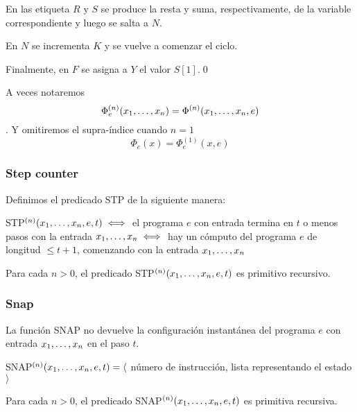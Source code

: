 \begin{demo}
En las etiqueta $R$ y $S$ se produce la resta y suma, respectivamente, de la variable correspondiente y luego se salta a $N$.

En $N$ se incrementa $K$ y se vuelve a comenzar el ciclo.

Finalmente, en $F$ se asigna a $Y$ el valor $S[1]$.\qed
\end{demo}

A veces notaremos $$\Phi^{(n)}_e(x_1,\dots, x_{n}) = \Phi^{(n)}(x_1,\dots, x_{n},e)$$. Y omitiremos el supra-índice cuando $n=1$
$$\Phi_e(x) = \Phi_e^{(1)}(x,e)$$


\subsubsection{Step counter}

Definimos el predicado STP de la siguiente manera:

STP$^{(n)}(x_1,\dots, x_{n}, e,t) \iff$ el programa $e$ con entrada termina en $t$ o menos pasos con la entrada $x_1,\dots, x_{n} \iff$ hay un cómputo del programa $e$ de longitud $\leq t+1$, comenzando con la entrada $x_1,\dots, x_{n}$

\begin{teorema}
	Para cada $n > 0$, el predicado STP$^{(n)}(x_1,\dots, x_{n}, e, t)$ es primitivo recursivo.
\end{teorema}

\subsubsection{Snap}
La función SNAP no devuelve la configuración instantánea del programa $e$ con entrada $x_1,\dots, x_{n}$ en el paso $t$.

SNAP$^{(n)}(x_1,\dots, x_{n}, e,t) = \langle$ número de instrucción, lista representando el estado $\rangle$ 

\begin{teorema}
	Para cada $n > 0$, el predicado SNAP$^{(n)}(x_1,\dots, x_{n}, e, t)$ es primitiva recursiva.
\end{teorema}

